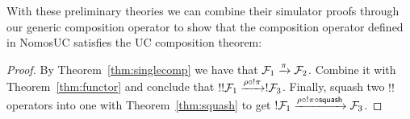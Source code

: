 With these preliminary theories we can combine their simulator proofs through our generic composition operator to show that the composition operator defined in NomosUC satisfies the UC composition theorem:
\begin{proof}
By Theorem~\ref{thm:singlecomp} we have that $\mathcal{F}_1 \xrightarrow{\pi} \mathcal{F}_2$. Combine it with Theorem~\ref{thm:functor} and conclude that $!!\mathcal{F}_1 \xrightarrow{\rho \circ !\pi} !\mathcal{F}_3$. 
Finally, squash two $!!$ operators into one with Theorem~\ref{thm:squash} to get $!\mathcal{F}_1 \xrightarrow{\rho \circ !\pi \circ \mathsf{squash}} \mathcal{F}_3$.
\end{proof}


%
%
